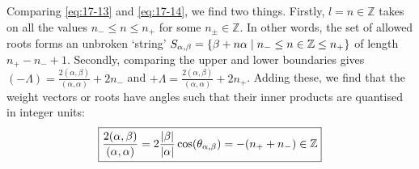 Comparing \eqref{eq:17-13} and \eqref{eq:17-14}, we find two things. Firstly, $l = n \in \mathbb{Z}$ takes on all the values $n_{-} \leq n \leq n_{+}$ for some $n_{\pm} \in \mathbb{Z}$. In other words, the set of allowed roots forms an unbroken `string' $S_{\alpha, \beta} = \left\{ \beta + n \alpha \suchthat n_- \leq n \in \mathbb{Z} \leq n_+ \right\}$ of length $n_+ - n_- + 1$.
Secondly, comparing the upper and lower boundaries gives $(-\Lambda) = \frac{2 (\alpha, \beta)}{(\alpha, \alpha)} + 2 n_{-}$ and $+\Lambda = \frac{2 (\alpha, \beta)}{(\alpha, \alpha)} + 2 n_{+}$. Adding these, we find that the weight vectors or roots have angles such that their inner products are quantised in integer units:
\begin{equation}
  \label{eq:17-15}
  \boxed{\frac{2 (\alpha, \beta)}{(\alpha, \alpha)} = 2 \frac{\abs{\beta}}{\abs{\alpha}} \cos(\theta_{\alpha,\beta}) = -(n_{+}+ n_{-}) \in \mathbb{Z}}
\end{equation}

